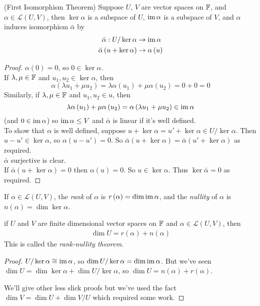 \documentclass[a4paper]{article}
\begin{document}
\begin{thm} (First Isomorphism Theorem) Suppose $U$, $V$ are vector spaces on $\mathbb{F}$, and $\alpha\in\mathcal{L}\left(U,V\right)$, then $\ker\alpha$ is a subspace of $U$, $\operatorname{im}\alpha$ is a subspace of $V$, and $\alpha$ induces isomorphism $\bar{\alpha}$ by
\begin{equation*}
\begin{aligned}
\bar{\alpha} : U/\ker\alpha &\to \operatorname{im}\alpha\\
\bar{\alpha}\left(u+\ker \alpha\right) &\to \alpha\left(u\right)
\end{aligned}
\end{equation*}
\begin{proof}
$\alpha\left(0\right) = 0$, so $0 \in \ker \alpha$.\\
If $\lambda,\mu \in \mathbb{F}$ and $u_1,u_2 \in \ker\alpha$, then $$\alpha\left(\lambda u_1+\mu u_2\right) = \lambda\alpha\left(u_1\right)+\mu\alpha\left(u_2\right) = 0+0=0$$
Similarly, if $\lambda,\mu \in \mathbb{F}$ and $u_1,u_2 \in u$, then $$
\lambda\alpha\left(u_1\right) + \mu\alpha\left(u_2\right) = \alpha\left(\lambda u_1+\mu u_2\right) \in \operatorname{im}\alpha$$
(and $0\in\operatorname{im}\alpha$) so $\operatorname{im}\alpha\leq V$ and $\bar{\alpha}$ is linear if it's well defined.\\
To show that $\alpha$ is well defined, suppose $u+\ker\alpha = u' + \ker\alpha \in U/\ker\alpha$. Then $u-u' \in \ker\alpha$, so $\alpha\left(u-u'\right) = 0$. So $\bar{\alpha}\left(u+\ker\alpha\right) = \bar{\alpha}\left(u'+\ker\alpha\right)$ as required.\\
$\bar{\alpha}$ surjective is clear.\\
If $\bar{\alpha}\left(u+\ker \alpha\right) = 0$ then $\alpha\left(u\right) = 0$. So $u\in\ker\alpha$. Thus $\ker\bar{\alpha}=0$ as required.
\end{proof}
\end{thm}

\begin{defi}
If $\alpha\in\mathcal{L}\left(U,V\right)$, the \emph{rank} of $\alpha$ is $r\left(\alpha\right) = \dim\operatorname{im}\alpha$, and the \emph{nullity} of $\alpha$ is $n\left(\alpha\right) = \dim\ker\alpha$.
\end{defi}

\begin{coro}
if $U$ and $V$ are finite dimensional vector spaces on $\mathbb{F}$ and $\alpha\in\mathcal{L}\left(U,V\right)$, then
\begin{equation*}
\begin{aligned}
\dim U = r\left(\alpha\right)+n\left(\alpha\right)
\end{aligned}
\end{equation*}
This is called the \emph{rank-nullity theorem}.
\begin{proof}
$U/\ker\alpha \cong \operatorname{im}\alpha$, so $\dim U/\ker\alpha = \dim\operatorname{im}\alpha$. But we've seen $\dim U = \dim\ker\alpha + \dim U/\ker\alpha$, so $\dim U = n\left(\alpha\right)+r\left(\alpha\right)$.

We'll give other less slick proofs but we've used the fact $\dim V = \dim U + \dim V/U$ which required some work.
\end{proof}
\end{coro}
\end{document}
